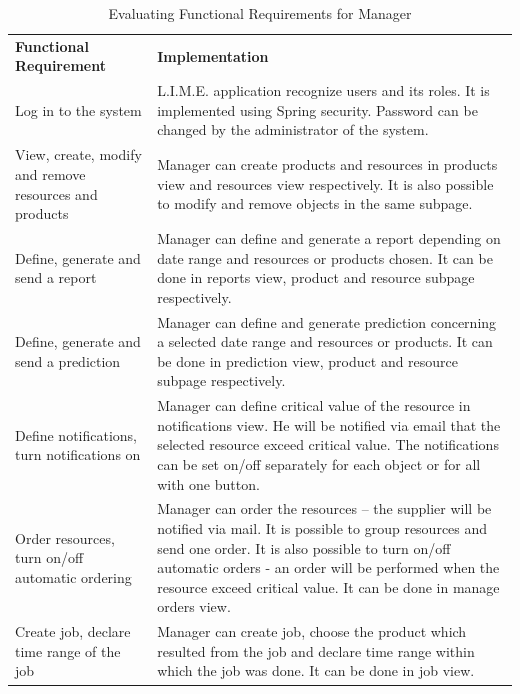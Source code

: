 \documentclass[a4paper,11pt,twoside]{report}
\theoremstyle{definition}
\begin{document}
\begin{longtable}{|p{4cm}|p{12cm}|}
\caption[Evaluating Functional Requirements for Manager]{Evaluating Functional Requirements for Manager}
\label{Evaluating Functional Requirements for Manager}
\centering
\tabularnewline

\hline
\textbf{Functional \mbox{Requirement}} & \textbf{Implementation} \\ \hline

Log in to the system & L.I.M.E. application recognize users and its roles. It is implemented using Spring security. Password can be changed by the administrator of the system. \\ \hline
View, create, modify and remove resources and products & Manager can create products and resources in products view and resources view respectively. It is also possible to modify and remove objects in the same subpage. \\ \hline
Define, generate and send a report & Manager can define and generate a report depending on date range and resources or products chosen. It can be done in reports view, product and resource subpage respectively. \\ \hline
Define, generate and send a prediction & Manager can define and generate prediction concerning a selected date range and resources or products. It can be done in prediction view, product and resource subpage respectively. \\ \hline
Define notifications, turn notifications on & Manager can define critical value of the resource in notifications view. He will be notified via email that the selected resource exceed critical value. The notifications can be set on/off separately for each object or for all with one button. \\ \hline
Order resources, turn on/off automatic ordering & Manager can order the resources – the supplier will be notified via mail. It is possible to group resources and send one order. It is also possible to turn on/off automatic orders - an order will be performed when the resource exceed critical value. It can be done in manage orders view. \\ \hline
Create job, declare time range of the job & Manager can create job, choose the product which resulted from the job and declare time range within which the job was done. It can be done in job view. \\ \hline



\end{longtable}
\end{document}
